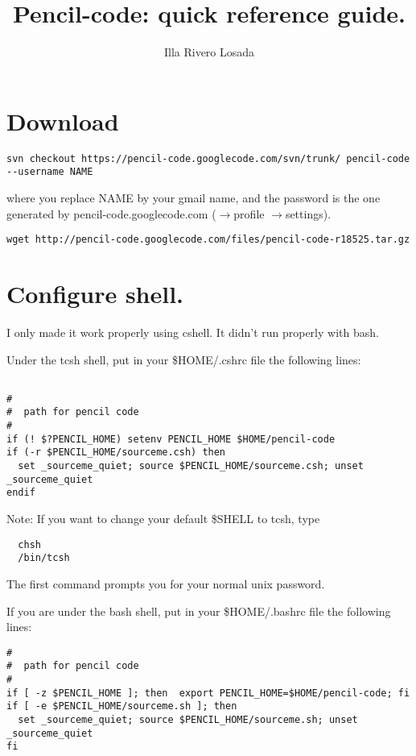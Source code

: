 \documentclass[a4paper,12pt]{article}
\title{Pencil-code: quick reference guide.}
\author{Illa Rivero Losada}
\date{}
\begin{document}
\maketitle

\tableofcontents

\newpage

\section{Download}
\begin{verbatim}
svn checkout https://pencil-code.googlecode.com/svn/trunk/ pencil-code
--username NAME
\end{verbatim}

where you replace NAME by your gmail name, and the password is the
one generated by pencil-code.googlecode.com ($\rightarrow$profile
$\rightarrow$settings). 

\begin{verbatim}
wget http://pencil-code.googlecode.com/files/pencil-code-r18525.tar.gz
\end{verbatim}

\section{Configure shell.}

I only made it work properly using cshell. It didn't run properly with bash.

Under the tcsh shell, put in your \$HOME/.cshrc file the following lines:
\begin{verbatim}

#
#  path for pencil code
#
if (! $?PENCIL_HOME) setenv PENCIL_HOME $HOME/pencil-code
if (-r $PENCIL_HOME/sourceme.csh) then
  set _sourceme_quiet; source $PENCIL_HOME/sourceme.csh; unset _sourceme_quiet
endif
\end{verbatim}

Note: If you want to change your default \$SHELL to tcsh, type

\begin{verbatim}
  chsh
  /bin/tcsh
\end{verbatim}

The first command prompts you for your normal unix password.

If you are under the bash shell, put in your \$HOME/.bashrc file the following
lines:
\begin{verbatim}
#
#  path for pencil code
#
if [ -z $PENCIL_HOME ]; then  export PENCIL_HOME=$HOME/pencil-code; fi
if [ -e $PENCIL_HOME/sourceme.sh ]; then
  set _sourceme_quiet; source $PENCIL_HOME/sourceme.sh; unset _sourceme_quiet
fi
\end{verbatim}
\end{document}
